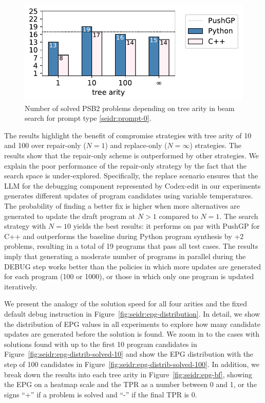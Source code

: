 \begin{figure}
  \centering
  \includegraphics[width=0.5\linewidth, trim={0mm 2.8mm 0mm 2mm}, clip]{images/num_solved_problems_vs_bf_1000_v3_zenodo.pdf}
  \caption{Number of solved PSB2 problems depending on tree arity in beam search for prompt type \ref{seidr:prompt-0}.}
  \label{fig:seidr:solved-vs-bf}
\end{figure}

The results highlight the benefit of compromise strategies with tree arity of 10 and 100 over repair-only ($N=1$) and replace-only ($N=\infty$) strategies. 
The results show that the repair-only scheme is outperformed by other strategies. 
We explain the poor performance of the repair-only strategy by the fact that the search space is under-explored. 
Specifically, the replace scenario ensures that the LLM for the debugging component represented by Codex-edit in our experiments generates different updates of program candidates using variable temperatures.
The probability of finding a better fix is higher when more alternatives are generated to update the draft program at $N>1$ compared to $N=1$. 
The search strategy with $N=10$ yields the best results: it performs on par with PushGP for C++ and outperforms the baseline during Python program synthesis by +2 problems, resulting in a total of 19 programs that pass all test cases.
The results imply that generating a moderate number of programs in parallel during the DEBUG step works better than the policies in which more updates are generated for each program (100 or 1000), 
or those in which only one program is updated iteratively.

We present the analogy of the solution speed for all four arities and the fixed default debug instruction in Figure~\ref{fig:seidr:epg-distribution}. 
In detail, we show the distribution of EPG values in all experiments to explore how many candidate updates are generated before the solution is found.
We zoom in to the cases with solutions found with up to the first 10 program candidates in Figure~\ref{fig:seidr:epg-distrib-solved-10} and show the EPG distribution with the step of 100 candidates in Figure~\ref{fig:seidr:epg-distrib-solved-100}. 
In addition, we break down the results into each tree arity in Figure~\ref{fig:seidr:epg-bf}, showing the EPG on a heatmap scale and the TPR as a number between 0 and 1, or the signs ``+'' if a problem is solved and ``-'' if the final TPR is 0. 


